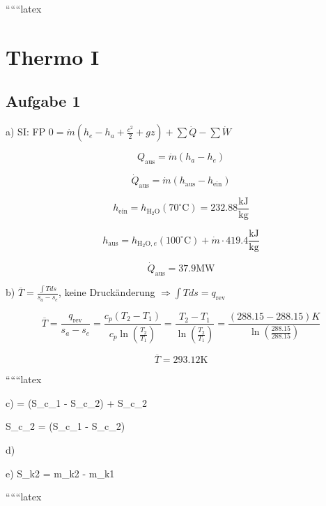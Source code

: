 
``````latex


\section*{Thermo I}
\subsection*{Aufgabe 1}

a) SI: FP \quad \(0 = \dot{m} (h_e - h_a + \frac{c^2}{2} + gz) + \sum \dot{Q} - \sum \dot{W}\)

\[
Q_{\text{aus}} = \dot{m} (h_a - h_e)
\]

\[
\dot{Q}_{\text{aus}} = \dot{m} (h_{\text{aus}} - h_{\text{ein}})
\]

\[
h_{\text{ein}} = h_{\text{H}_2\text{O}} (70^\circ \text{C}) = 232.88 \frac{\text{kJ}}{\text{kg}}
\]

\[
h_{\text{aus}} = h_{\text{H}_2\text{O}, e} (100^\circ \text{C}) + \dot{m} \cdot 419.4 \frac{\text{kJ}}{\text{kg}}
\]

\[
\dot{Q}_{\text{aus}} = 37.9 \text{MW}
\]

b) \(\overline{T} = \frac{\int T ds}{s_a - s_e}\), keine Druckänderung \(\Rightarrow \int T ds = q_{\text{rev}}\)

\[
\overline{T} = \frac{q_{\text{rev}}}{s_a - s_e} = \frac{c_p (T_2 - T_1)}{c_p \ln \left( \frac{T_2}{T_1} \right)} = \frac{T_2 - T_1}{\ln \left( \frac{T_2}{T_1} \right)} = \frac{(288.15 - 288.15) K}{\ln \left( \frac{288.15}{288.15} \right)}
\]

\[
\overline{T} = 293.12 \text{K}
\]

``````latex

c)  = (S_{c_1} - S_{c_2}) + \epsilon {} \tau S_{c_2}

\quad \quad S_{c_2} = (S_{c_1} - S_{c_2})  

d)

e) \quad \Delta S_{k2} = m_{k2} - m_{k1}

``````latex


